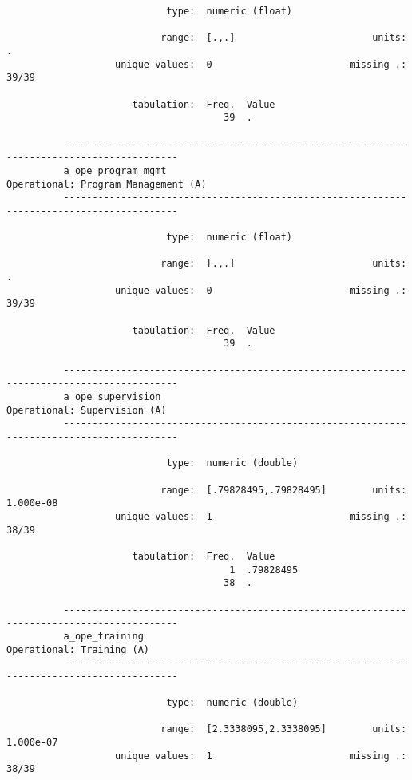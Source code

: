 \documentclass{article}
\begin{document}
\begin{verbatim}
                            type:  numeric (float)
          
                           range:  [.,.]                        units:  .
                   unique values:  0                        missing .:  39/39
          
                      tabulation:  Freq.  Value
                                      39  .
          
          ------------------------------------------------------------------------------------------
          a_ope_program_mgmt                                     Operational: Program Management (A)
          ------------------------------------------------------------------------------------------
          
                            type:  numeric (float)
          
                           range:  [.,.]                        units:  .
                   unique values:  0                        missing .:  39/39
          
                      tabulation:  Freq.  Value
                                      39  .
          
          ------------------------------------------------------------------------------------------
          a_ope_supervision                                             Operational: Supervision (A)
          ------------------------------------------------------------------------------------------
          
                            type:  numeric (double)
          
                           range:  [.79828495,.79828495]        units:  1.000e-08
                   unique values:  1                        missing .:  38/39
          
                      tabulation:  Freq.  Value
                                       1  .79828495
                                      38  .
          
          ------------------------------------------------------------------------------------------
          a_ope_training                                                   Operational: Training (A)
          ------------------------------------------------------------------------------------------
          
                            type:  numeric (double)
          
                           range:  [2.3338095,2.3338095]        units:  1.000e-07
                   unique values:  1                        missing .:  38/39
          

\end{verbatim}
\end{document}
